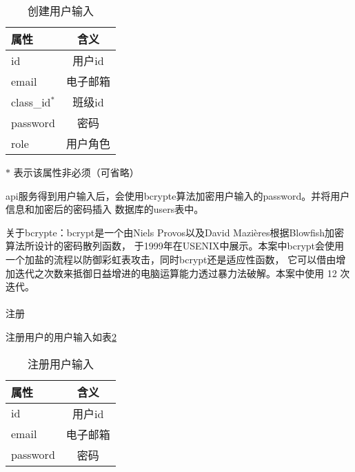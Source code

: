 \begin{table}[htpb!]
    \centering
    \caption{\label{user_in}创建用户输入}
    \begin{threeparttable}
        \begin{tabular}{lc}
            \toprule
            属性          & 含义     \\
            \midrule
            id            & 用户id   \\
            email         & 电子邮箱 \\
            class\_id$^*$ & 班级id   \\
            password      & 密码     \\
            role          & 用户角色 \\
            \bottomrule
        \end{tabular}
        \begin{tablenotes}
            \footnotesize
            \item[$*$] 表示该属性非必须（可省略）
        \end{tablenotes}
    \end{threeparttable}
\end{table}

api服务得到用户输入后，会使用bcrypte算法加密用户输入的password。并将用户信息和加密后的密码插入
数据库的users表中。

关于bcrypte：bcrypt是一个由Niels Provos以及David Mazières根据Blowfish加密算法所设计的密码散列函数，
于1999年在USENIX中展示\cite{bycrypto}。本案中bcrypt会使用一个加盐的流程以防御彩虹表攻击，同时bcrypt还是适应性函数，
它可以借由增加迭代之次数来抵御日益增进的电脑运算能力透过暴力法破解。本案中使用 12 次迭代。

\paragraph{}注册

注册用户的用户输入如表\ref{sign_up_in}
\begin{table}[htpb!]
    \centering
    \caption{\label{sign_up_in}注册用户输入}
    \begin{threeparttable}
        \begin{tabular}{lc}
            \toprule
            属性          & 含义     \\
            \midrule
            id            & 用户id   \\
            email         & 电子邮箱 \\
            password      & 密码     \\
            \bottomrule
        \end{tabular}
    \end{threeparttable}
\end{table}

